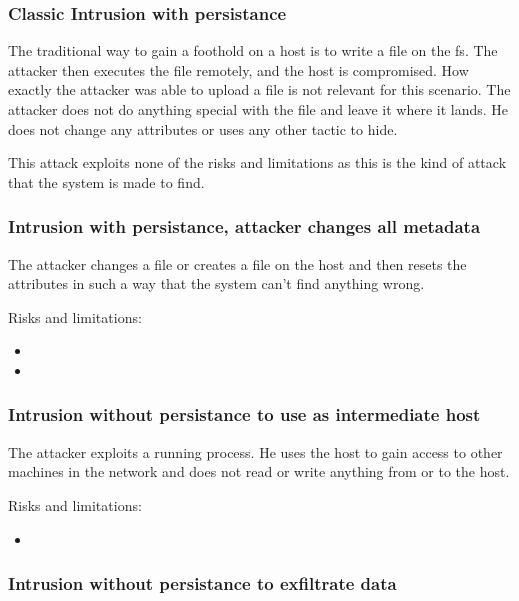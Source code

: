 \subsubsection{Classic Intrusion with persistance}
\label{sec:attack:classic}

The traditional way to gain a foothold on a host is to write a file on the \gls{fs}. The attacker then executes the file remotely, and the host is compromised. How exactly the attacker was able to upload a file is not relevant for this scenario. The attacker does not do anything special with the file and leave it where it lands. He does not change any attributes or uses any other tactic to hide.

This attack exploits none of the risks and limitations as this is the kind of attack that the system is made to find. 

\subsubsection{Intrusion with persistance, attacker changes all metadata}
\label{sec:attack:changeattr}

The attacker changes a file or creates a file on the host and then resets the attributes in such a way that the system can't find anything wrong.

Risks and limitations:
\begin{itemize}
	\item {}
	\item {}
\end{itemize}

\subsubsection{Intrusion without persistance to use as intermediate host}
\label{sec:attack:nopersistanceintermediatehost}

The attacker exploits a running process. He uses the host to gain access to other machines in the network and does not read or write anything from or to the host. 

Risks and limitations:
\begin{itemize}
	\item {}
\end{itemize}

\subsubsection{Intrusion without persistance to exfiltrate data}
\label{sec:attack:nopersistanceexfiltration}

